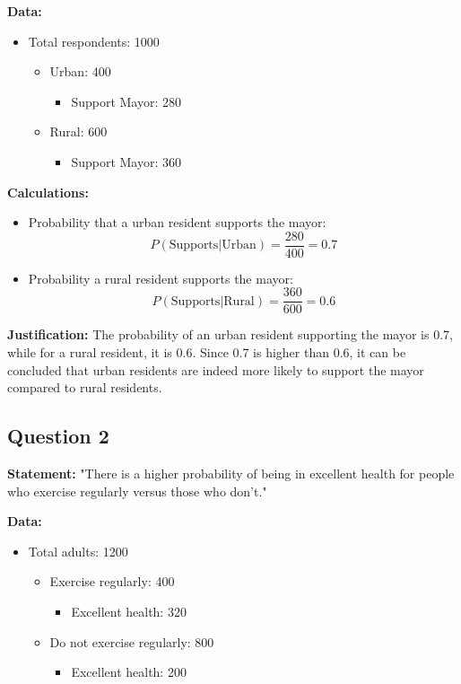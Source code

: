 \documentclass{article}
\begin{document}
\textbf{Data:}
\begin{itemize}
    \item Total respondents: 1000
    \begin{itemize}
        \item Urban: 400
        \begin{itemize}
            \item Support Mayor: 280
        \end{itemize}
        \item Rural: 600
        \begin{itemize}
            \item Support Mayor: 360
        \end{itemize}
    \end{itemize}
\end{itemize}

\textbf{Calculations:}
\begin{itemize}
    \item Probability that a urban resident supports the mayor:
    \[
    P(\text{Supports} | \text{Urban}) = \frac{280}{400} = 0.7
    \]
    \item Probability a rural resident supports the mayor:
    \[
    P(\text{Supports} | \text{Rural}) = \frac{360}{600} = 0.6
    \]
\end{itemize}

\textbf{Justification:}
The probability of an urban resident supporting the mayor is 0.7, while for a rural resident, it is 0.6. Since 0.7 is higher than 0.6, it can be concluded that urban residents are indeed more likely to support the mayor compared to rural residents.

\subsection*{Question 2}
\textbf{Statement:} "There is a higher probability of being in excellent health for people who exercise regularly versus those who don’t."

\textbf{Data:}
\begin{itemize}
    \item Total adults: 1200
    \begin{itemize}
        \item Exercise regularly: 400
        \begin{itemize}
            \item Excellent health: 320
        \end{itemize}
        \item Do not exercise regularly: 800
        \begin{itemize}
            \item Excellent health: 200
        \end{itemize}
    \end{itemize}
\end{itemize}
\end{document}
